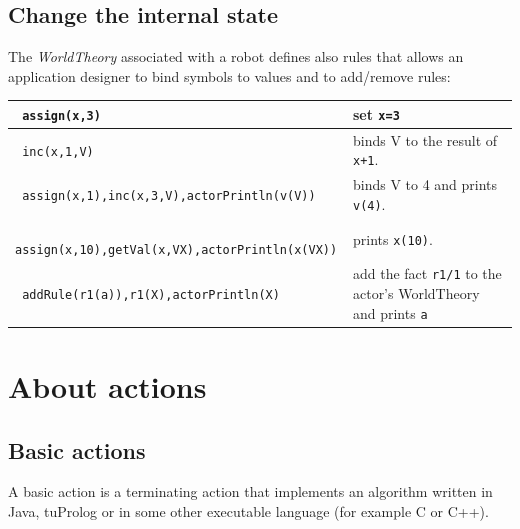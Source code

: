 \subsection{Change the internal state}

The \textit{WorldTheory} associated with a robot defines also rules that allows an application designer to bind symbols to values and to add/remove rules:

\medskip 
\noindent
\begin{footnotesize}
\begin{tabular}{|p{}|p{}|}
\hline 
\texttt{ assign(x,3)} & set \texttt{x=3}  \\ 
\hline 
\texttt{ inc(x,1,V) } & binds V to the result of \texttt{x+1}.  \\ 
\hline 
\texttt{ assign(x,1),inc(x,3,V),actorPrintln(v(V))} & binds V to 4 and prints \texttt{v(4)}.  \\ 
\hline 
\texttt{ assign(x,10),getVal(x,VX),actorPrintln(x(VX))} & prints \texttt{x(10)}.  \\ 
\hline 
\texttt{ addRule(r1(a)),r1(X),actorPrintln(X) } & add the fact \texttt{r1/1} to the actor's WorldTheory and  prints \texttt{a} \\ 
\hline 
\end{tabular} 
\end{footnotesize}



 


\newpage
	


\newpage
\section{About actions}
\subsection{Basic actions}

A basic action is a terminating action that implements an algorithm written in Java, tuProlog or in some other executable language (for example C or C++).

